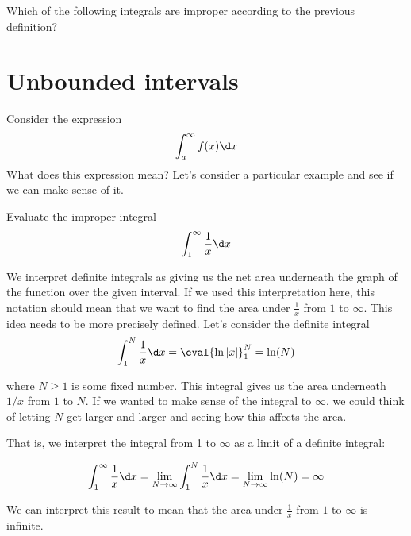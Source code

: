 \documentclass{ximera}
\begin{document}
\begin{question}
  Which of the following integrals are improper according to the previous definition?
  \begin{selectAll}
  \end{selectAll}
\end{question}





\section{Unbounded intervals}


Consider the expression
\[ 
\int_{a}^{\infty} f(x) \d x
\]
What does this expression mean?  Let's consider a particular example and see if we can make sense of it.

\begin{example}
Evaluate the improper integral
\[ 
\int_{1}^{\infty} \frac{1}{x} \d x
\]
\begin{explanation}

We interpret definite integrals as giving us the net area underneath the graph of the function over the given interval. If we used this interpretation here, this notation should mean that we want to find the area under $\frac{1}{x}$ from $1$ to $\infty$.  This idea needs to be more precisely defined.  Let's consider the definite integral
\[
\int_{1}^{N} \frac{1}{x} \d x=\eval{\ln|x|}_{1}^{N}=\ln(N)
\]

where $N \geq 1$ is some fixed number. 
 This integral gives us the area underneath $1/x$ from $1$ to $N$. If we wanted to make sense of the integral to $\infty$, we could think of letting $N$ 
get larger and larger and seeing how this affects the area. 

That is, we interpret the integral from 1 to $\infty$ as a limit of a definite integral:

\[
\int_{1}^{\infty} \frac{1}{x} \d x= \lim_{N \to \infty} \int_{1}^{N} \frac{1}{x} \d x= \lim_{N \to \infty} \ln(N) = \infty
\]

We can interpret this result to mean that the area under $\frac{1}{x}$ from $1$ to $\infty$ is infinite.
\end{explanation}
\end{example}
\end{document}
